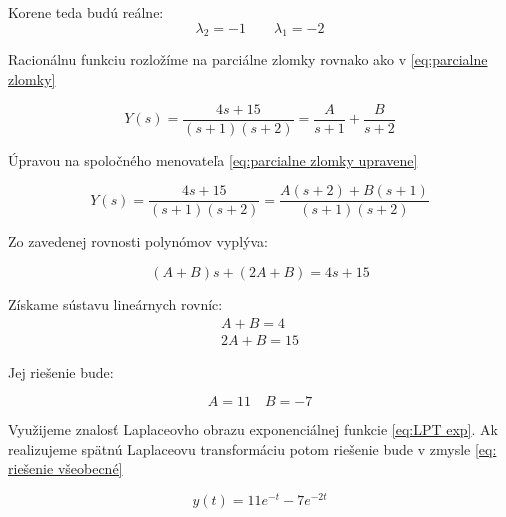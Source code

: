 \documentclass[a4paper,10pt]{article}
\begin{document}
Korene teda budú reálne:
\begin{equation*}
	\lambda_2=-1 \qquad \lambda_1=-2
\end{equation*}


Racionálnu funkciu rozložíme na parciálne zlomky rovnako ako v \eqref{eq:parcialne zlomky}

\begin{equation*}
Y(s)=\frac{4s+15}{(s+1)(s+2)}=\frac{A}{s+1}+\frac{B}{s+2}
\end{equation*}

Úpravou na spoločného menovateľa \eqref{eq:parcialne zlomky upravene}

\begin{equation*}
Y(s)=\frac{4s+15}{(s+1)(s+2)}=\frac{A(s+2)+B(s+1)}{(s+1)(s+2)}
\end{equation*}

Zo zavedenej rovnosti polynómov vyplýva:

\begin{equation*}
(A+B)s+(2A+B)=4s+15
\end{equation*}

Získame sústavu lineárnych rovníc:
\begin{equation*}
\begin{array}{c}
	A+B=4 \\
	2A+B=15
\end{array}
\end{equation*}

Jej riešenie bude:

\begin{equation*}
A=11 \quad B=-7
\end{equation*}

Využijeme znalosť Laplaceovho obrazu exponenciálnej funkcie \eqref{eq:LPT exp}.
Ak realizujeme spätnú Laplaceovu transformáciu potom riešenie bude v zmysle \eqref{eq: riešenie všeobecné}

\begin{equation*}
y(t)=11e^{-t}-7e^{-2t}
\end{equation*}
\end{document}
